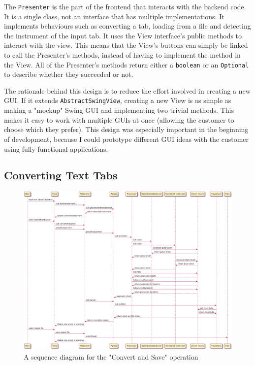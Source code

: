 \documentclass[11pt]{article}
\begin{document}
The \texttt{Presenter} is the part of the frontend that interacts with the backend code.  It is a single class, not an interface that has multiple implementations.  It implements behaviours such as converting a tab, loading from a file and detecting the instrument of the input tab.  It uses the View interface's public methods to interact with the view.  This means that the View's buttons can simply be linked to call the Presenter's methods, instead of having to implement the method in the View.  All of the Presenter's methods return either a \texttt{boolean} or an \texttt{Optional} to describe whether they succeeded or not.

The rationale behind this design is to reduce the effort involved in creating a new GUI.  If it extends \texttt{AbstractSwingView}, creating a new View is as simple as making a "mockup" Swing GUI and implementing two trivial methods.  This makes it easy to work with multiple GUIs at once (allowing the customer to choose which they prefer).  This design was especially important in the beginning of development, because I could prototype different GUI ideas with the customer using fully functional applications.
\subsection{Converting Text Tabs}
\label{sec:org5d1c3e0}
\begin{figure}[htbp]
\centering
\includegraphics[width=.9\linewidth]{./Diagrams/convert-and-save-2.png}
\caption{A sequence diagram for the "Convert and Save" operation}
\end{figure}
\end{document}
